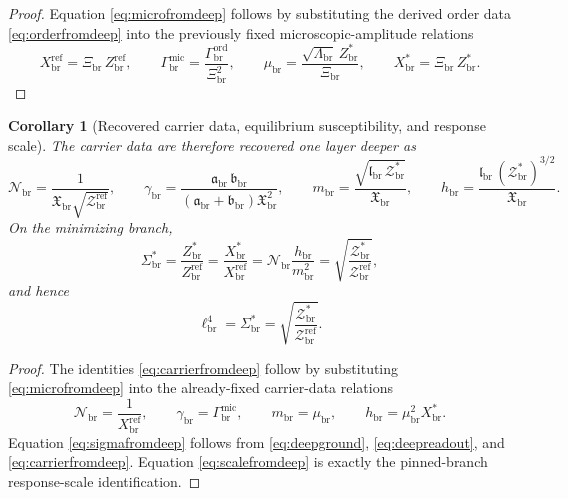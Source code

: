 \documentclass[11pt]{article}
\newcommand{\CurvScale}{\ell_{\mathrm{br}}}
\newcommand{\RespSusEq}{\Sigma_{\mathrm{br}}^{\ast}}
\newcommand{\RespNorm}{\mathcal N_{\mathrm{br}}}
\newcommand{\RespFluxCoeff}{\gamma_{\mathrm{br}}}
\newcommand{\RespGap}{m_{\mathrm{br}}}
\newcommand{\RespBias}{h_{\mathrm{br}}}
\newcommand{\RespMicroEq}{X_{\mathrm{br}}^{\ast}}
\newcommand{\RespMicroRef}{X_{\mathrm{br}}^{\mathrm{ref}}}
\newcommand{\RespMicroFluxCoeff}{\Gamma_{\mathrm{br}}^{\mathrm{mic}}}
\newcommand{\RespMicroGap}{\mu_{\mathrm{br}}}
\newcommand{\RespOrderRef}{Z_{\mathrm{br}}^{\mathrm{ref}}}
\newcommand{\RespOrderEq}{Z_{\mathrm{br}}^{\ast}}
\newcommand{\RespOrderReadout}{\Xi_{\mathrm{br}}}
\newcommand{\RespOrderStiff}{\Gamma_{\mathrm{br}}^{\mathrm{ord}}}
\newcommand{\RespOrderQuartic}{\Lambda_{\mathrm{br}}}
\newcommand{\RespDeepDensityRef}{\mathcal Z_{\mathrm{br}}^{\mathrm{ref}}}
\newcommand{\RespDeepDensityEq}{\mathcal Z_{\mathrm{br}}^{\ast}}
\newcommand{\RespDeepReadout}{\mathfrak X_{\mathrm{br}}}
\newcommand{\RespDeepTrack}{\mathfrak a_{\mathrm{br}}}
\newcommand{\RespDeepRelax}{\mathfrak b_{\mathrm{br}}}
\newcommand{\RespDeepWell}{\mathfrak l_{\mathrm{br}}}
\newtheorem{corollary}{Corollary}
\begin{document}
\begin{proof}
Equation \eqref{eq:microfromdeep} follows by substituting the derived order data \eqref{eq:orderfromdeep} into the previously fixed microscopic-amplitude relations
\[
\RespMicroRef=\RespOrderReadout\,\RespOrderRef,
\qquad
\RespMicroFluxCoeff=\frac{\RespOrderStiff}{\RespOrderReadout^2},
\qquad
\RespMicroGap=\frac{\sqrt{\RespOrderQuartic}\,\RespOrderEq}{\RespOrderReadout},
\qquad
\RespMicroEq=\RespOrderReadout\,\RespOrderEq.
\]
\end{proof}

\begin{corollary}[Recovered carrier data, equilibrium susceptibility, and response scale]
\label{cor:carrierandscale}
The carrier data are therefore recovered one layer deeper as
\begin{equation}
\RespNorm=\frac{1}{\RespDeepReadout\sqrt{\RespDeepDensityRef}},
\qquad
\RespFluxCoeff=\frac{\RespDeepTrack\,\RespDeepRelax}{(\RespDeepTrack+\RespDeepRelax)\RespDeepReadout^2},
\qquad
\RespGap=\frac{\sqrt{\RespDeepWell\,\RespDeepDensityEq}}{\RespDeepReadout},
\qquad
\RespBias=\frac{\RespDeepWell\,(\RespDeepDensityEq)^{3/2}}{\RespDeepReadout}.
\label{eq:carrierfromdeep}
\end{equation}
On the minimizing branch,
\begin{equation}
\RespSusEq
=
\frac{\RespOrderEq}{\RespOrderRef}
=
\frac{\RespMicroEq}{\RespMicroRef}
=
\RespNorm\frac{\RespBias}{\RespGap^2}
=
\sqrt{\frac{\RespDeepDensityEq}{\RespDeepDensityRef}},
\label{eq:sigmafromdeep}
\end{equation}
and hence
\begin{equation}
\CurvScale^4=\RespSusEq=\sqrt{\frac{\RespDeepDensityEq}{\RespDeepDensityRef}}.
\label{eq:scalefromdeep}
\end{equation}
\end{corollary}

\begin{proof}
The identities \eqref{eq:carrierfromdeep} follow by substituting \eqref{eq:microfromdeep} into the already-fixed carrier-data relations
\[
\RespNorm=\frac{1}{\RespMicroRef},
\qquad
\RespFluxCoeff=\RespMicroFluxCoeff,
\qquad
\RespGap=\RespMicroGap,
\qquad
\RespBias=\RespMicroGap^2\RespMicroEq.
\]
Equation \eqref{eq:sigmafromdeep} follows from \eqref{eq:deepground}, \eqref{eq:deepreadout}, and \eqref{eq:carrierfromdeep}. Equation \eqref{eq:scalefromdeep} is exactly the pinned-branch response-scale identification.
\end{proof}
\end{document}
